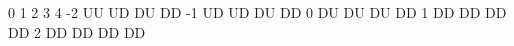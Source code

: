 0   1   2   3   4
-2   UU   UD   DU   DD
-1   UD   UD   DU   DD
 0   DU   DU   DU   DD
 1   DD   DD   DD   DD
 2   DD   DD   DD   DD